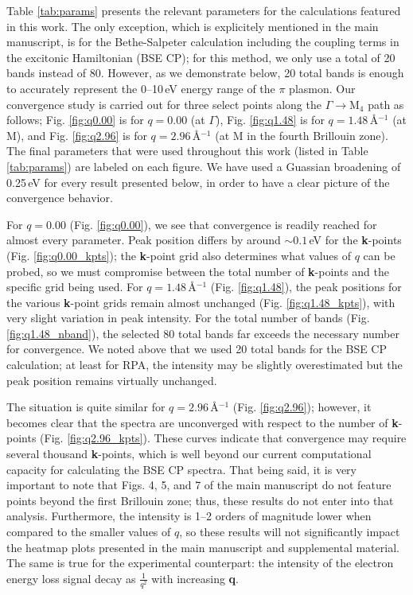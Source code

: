 \documentclass[aps,prb,10pt,superscriptaddress,notitlepage,endfloats]{revtex4-1}
\begin{document}
Table \ref{tab:params} presents the relevant parameters for the calculations
featured in this work. The only exception, which is explicitely mentioned in the
main manuscript, is for the Bethe-Salpeter calculation including the coupling
terms in the excitonic Hamiltonian (BSE CP); for this method, we only use a
total of 20 bands instead of 80. However, as we demonstrate below, 20 total
bands is enough to accurately represent the 0--10\,eV energy range of the $\pi$
plasmon. Our convergence study is carried out for three select points along the
$\Gamma\rightarrow\mathrm{M}_{4}$ path as follows; Fig. \ref{fig:q0.00} is for
$q=0.00$ (at $\Gamma$), Fig. \ref{fig:q1.48} is for $q=1.48$\,\r{A}$^{-1}$ (at
M), and Fig. \ref{fig:q2.96} is for $q=2.96$\,\r{A}$^{-1}$ (at M in the fourth
Brillouin zone). The final parameters that were used throughout this work
(listed in Table \ref{tab:params}) are labeled on each figure. We have used a
Guassian broadening of 0.25\,eV for every result presented below, in order to
have a clear picture of the convergence behavior.

For $q=0.00$ (Fig. \ref{fig:q0.00}), we see that convergence is readily reached
for almost every parameter. Peak position differs by around $\sim0.1$\,eV for
the \textbf{k}-points (Fig. \ref{fig:q0.00_kpts}); the \textbf{k}-point grid
also determines what values of $q$ can be probed, so we must compromise between
the total number of \textbf{k}-points and the specific grid being used. For
$q=1.48$\,\r{A}$^{-1}$ (Fig. \ref{fig:q1.48}), the peak positions for the
various \textbf{k}-point grids remain almost unchanged (Fig.
\ref{fig:q1.48_kpts}), with very slight variation in peak intensity. For the
total number of bands (Fig. \ref{fig:q1.48_nband}), the selected 80 total bands
far exceeds the necessary number for convergence. We noted above that we used 20
total bands for the BSE CP calculation; at least for RPA, the intensity may be
slightly overestimated but the peak position remains virtually unchanged.

The situation is quite similar for $q=2.96$\,\r{A}$^{-1}$ (Fig.
\ref{fig:q2.96}); however, it becomes clear that the spectra are unconverged
with respect to the number of \textbf{k}-points (Fig. \ref{fig:q2.96_kpts}).
These curves indicate that convergence may require several thousand
\textbf{k}-points, which is well beyond our current computational capacity for
calculating the BSE CP spectra. That being said, it is very important to note
that Figs. 4, 5, and 7 of the main manuscript do not feature points beyond the
first Brillouin zone; thus, these results do not enter into that analysis.
Furthermore, the intensity is 1--2 orders of magnitude lower when compared to
the smaller values of $q$, so these results will not significantly impact the
heatmap plots presented in the main manuscript and supplemental material. The
same is true for the experimental counterpart: the intensity of the electron
energy loss signal decay as $\frac{1}{q^{2}}$ with increasing \textbf{q}.
\end{document}
